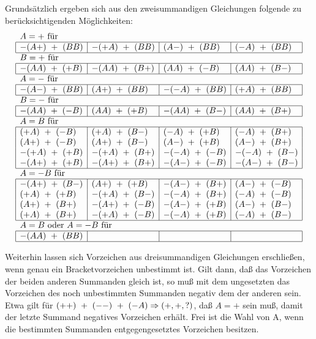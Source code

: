 Grundsätzlich ergeben sich aus den zweisummandigen Gleichungen folgende zu
be\-rücksichtigenden Möglichkeiten:
{\small
$$
\begin{array}{|l|l|l|l|}
\multicolumn{4}{l}{A=+ \mbox{ für }} \\
\hline
-(A+)~+~(BB) & -(+A)~+~(BB) & (A-)~+~(BB) & (-A)~+~(BB) \\
\hline
\multicolumn{4}{l}{B=+ \mbox{ für }} \\
\hline
-(AA)~+~(+B) & -(AA)~+~(B+) & (AA)~+~(-B) & (AA)~+~(B-) \\
\hline
\multicolumn{4}{l}{A=- \mbox{ für }} \\
\hline
-(A-)~+~(BB) & (A+)~+~(BB) & -(-A)~+~(BB) & (+A)~+~(BB) \\
\hline
\multicolumn{4}{l}{B=- \mbox{ für }} \\
\hline
-(AA)~+~(-B) & (AA)~+~(+B) & -(AA)~+~(B-) & (AA)~+~(B+) \\
\hline
\multicolumn{4}{l}{A=B \mbox{ für }} \\
\hline
 (+A)~+~(-B) &  (+A)~+~(B-) &  (-A)~+~(+B) &  (-A)~+~(B+) \\
 (A+)~+~(-B) &  (A+)~+~(B-) &  (A-)~+~(+B) &  (A-)~+~(B+) \\
-(+A)~+~(+B) & -(+A)~+~(B+) & -(-A)~+~(-B) & -(-A)~+~(B-) \\
-(A+)~+~(+B) & -(A+)~+~(B+) & -(A-)~+~(-B) & -(A-)~+~(B-) \\
\hline
\multicolumn{4}{l}{A=-B \mbox{ für }} \\
\hline
-(A+)~+~(B-) &  (A+)~+~(+B) & -(A-)~+~(B+) &  (A-)~+~(-B) \\
 (+A)~+~(+B) & -(+A)~+~(B-) & -(-A)~+~(B+) &  (-A)~+~(-B) \\
 (A+)~+~(B+) & -(A+)~+~(-B) & -(A-)~+~(+B) &  (A-)~+~(B-) \\
 (+A)~+~(B+) & -(+A)~+~(-B) & -(-A)~+~(+B) &  (-A)~+~(B-) \\
\hline
\multicolumn{4}{l}{A=B \mbox{ oder } A=-B \mbox{ für }} \\
\hline
-(AA)~+~(BB) & & & \\
\hline
\end{array}
$$}

Weiterhin lassen sich Vorzeichen aus dreisummandigen Gleichungen erschließen,
wenn genau ein Bracketvorzeichen unbestimmt ist. Gilt dann, daß das Vorzeichen
der beiden anderen Summanden gleich ist, so muß mit dem ungesetzten das
Vorzeichen des noch unbestimmten Summanden negativ dem der anderen sein.
Etwa gilt für $(++)~+~(--)~+~(-A)\Rightarrow (+,+,?)$, daß $A=+$ sein muß, damit
der letzte Summand negatives Vorzeichen erhält. Frei ist die Wahl von A, wenn
die bestimmten Summanden entgegengesetztes Vorzeichen besitzen.

